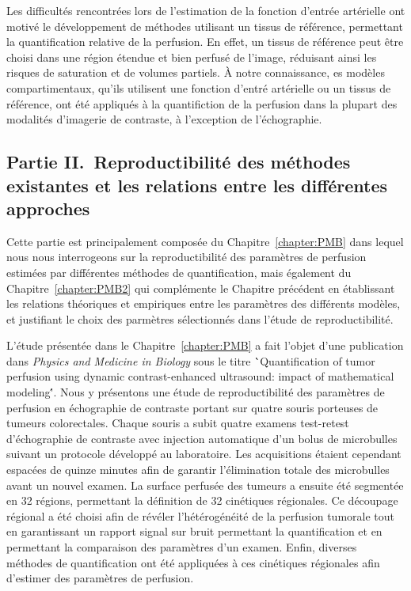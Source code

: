 \begin{otherlanguage}{francais}
Les difficult\'es rencontr\'ees lors de l'estimation de la fonction d'entr\'ee art\'erielle ont motiv\'e le d\'eveloppement de m\'ethodes utilisant un tissus de r\'ef\'erence, permettant la quantification relative de la perfusion.
En effet, un tissus de r\'ef\'erence peut \^etre choisi dans une r\'egion \'etendue et bien perfus\'e de l'image, r\'eduisant ainsi les risques de saturation et de volumes partiels.
\`A notre connaissance, es mod\`eles compartimentaux, qu'ils utilisent une fonction d'entr\'e art\'erielle ou un tissus de r\'ef\'erence, ont \'et\'e appliqu\'es \`a la quantifiction de la perfusion dans la plupart des modalit\'es d'imagerie de contraste, \`a l'exception de l'\'echographie.

\subsection*{Partie II.~Reproductibilit\'e des m\'ethodes existantes et les relations entre les diff\'erentes approches}
Cette partie est principalement compos\'ee du Chapitre~\ref{chapter:PMB} dans lequel nous nous interrogeons sur la reproductibilit\'e des param\`etres de perfusion estim\'ees par diff\'erentes m\'ethodes de quantification, mais \'egalement du Chapitre~\ref{chapter:PMB2} qui compl\'emente le Chapitre pr\'ec\'edent en \'etablissant les relations th\'eoriques et empiriques entre les param\`etres des diff\'erents mod\`eles, et justifiant le choix des parm\`etres s\'electionn\'es dans l'\'etude de reproductibilit\'e.

L'\'etude pr\'esent\'ee dans le Chapitre~\ref{chapter:PMB} a fait l'objet d'une publication dans {\em Physics and Medicine in Biology} sous le titre \``Quantification of tumor perfusion using dynamic contrast-enhanced ultrasound: impact of mathematical modeling\''.
Nous y pr\'esentons une \'etude de reproductibilit\'e des param\`etres de perfusion en \'echographie de contraste portant sur quatre souris porteuses de tumeurs colorectales.
Chaque souris a subit quatre examens test-retest d'\'echographie de contraste avec injection automatique d'un bolus de microbulles suivant un protocole d\'evelopp\'e au laboratoire.
Les acquisitions \'etaient cependant espac\'ees de quinze minutes afin de garantir l'\'elimination totale des microbulles avant un nouvel examen.
La surface perfus\'ee des tumeurs a ensuite \'et\'e segment\'ee en 32 r\'egions, permettant la d\'efinition de 32 cin\'etiques r\'egionales.
Ce d\'ecoupage r\'egional a \'et\'e choisi afin de r\'ev\'eler l'h\'et\'erog\'en\'eit\'e de la perfusion tumorale tout en garantissant un rapport signal sur bruit permettant la quantification et en permettant la comparaison des param\`etres d'un examen.
Enfin, diverses m\'ethodes de quantification ont \'et\'e appliqu\'ees \`a ces cin\'etiques r\'egionales afin d'estimer des param\`etres de perfusion.


\end{otherlanguage}
